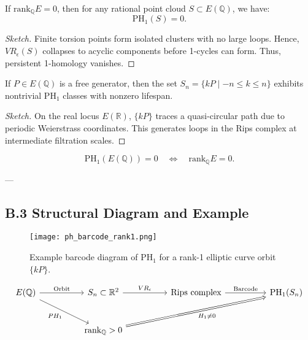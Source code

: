 \begin{theorem}
If \( \mathrm{rank}_{\mathbb{Q}} E = 0 \), then for any rational point cloud \( S \subset E(\mathbb{Q}) \), we have:
\[
\mathrm{PH}_1(S) = 0.
\]
\end{theorem}

\begin{proof}[Sketch]
Finite torsion points form isolated clusters with no large loops.  
Hence, \( VR_\epsilon(S) \) collapses to acyclic components before 1-cycles can form.  
Thus, persistent 1-homology vanishes.
\end{proof}

\begin{lemma}
If \( P \in E(\mathbb{Q}) \) is a free generator, then the set \( S_n = \{ kP \mid -n \leq k \leq n \} \)  
exhibits nontrivial \( \mathrm{PH}_1 \) classes with nonzero lifespan.
\end{lemma}

\begin{proof}[Sketch]
On the real locus \( E(\mathbb{R}) \), \( \{kP\} \) traces a quasi-circular path due to periodic Weierstrass coordinates.  
This generates loops in the Rips complex at intermediate filtration scales.
\end{proof}

\begin{corollary}
\[
\mathrm{PH}_1(E(\mathbb{Q})) = 0 \quad \Leftrightarrow \quad \mathrm{rank}_{\mathbb{Q}}E = 0.
\]
\end{corollary}

---

\subsection*{B.3 Structural Diagram and Example}

\begin{figure}[h]
  \centering
  \texttt{[image: ph\_barcode\_rank1.png]}
  \caption{Example barcode diagram of \( \mathrm{PH}_1 \) for a rank-1 elliptic curve orbit \( \{kP\} \).}
\end{figure}

\[
\begin{tikzcd}[row sep=large, column sep=huge]
E(\mathbb{Q}) \arrow[r, "\text{Orbit}"] \arrow[dr, swap, "PH_1"] & 
S_n \subset \mathbb{R}^2 \arrow[r, "VR_\epsilon"] &
\text{Rips complex} \arrow[r, "\text{Barcode}"] &
\mathrm{PH}_1(S_n) \\
& \mathrm{rank}_{\mathbb{Q}} > 0 \arrow[urr, Rightarrow, swap, "H_1 \neq 0"]
\end{tikzcd}
\]

